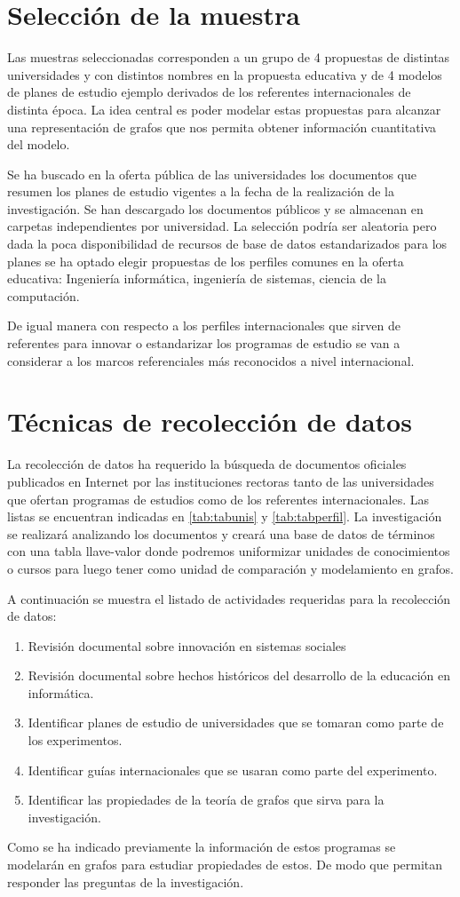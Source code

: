 \section{Selección de la muestra}
Las muestras seleccionadas corresponden a un grupo de 4 propuestas de distintas universidades y con distintos nombres en la propuesta educativa y de 4 modelos de planes de estudio ejemplo derivados de los referentes internacionales de distinta época. La idea central es poder modelar estas propuestas para alcanzar una representación de grafos que nos permita obtener información cuantitativa del modelo.

Se ha buscado en la oferta pública de las universidades los documentos que resumen los planes de estudio vigentes a la fecha de la realización de la investigación. Se han descargado los documentos públicos y se almacenan en carpetas independientes por universidad. La selección podría ser aleatoria pero dada la poca disponibilidad de recursos de base de datos estandarizados para los planes se ha optado elegir propuestas de los perfiles comunes en la oferta educativa: Ingeniería informática, ingeniería de sistemas, ciencia de la computación.

De igual manera con respecto a los perfiles internacionales que sirven de referentes para innovar o estandarizar los programas de estudio se van a considerar a los marcos referenciales más reconocidos a nivel internacional.

\section{Técnicas de recolección de datos}

La recolección de datos ha requerido la búsqueda de documentos oficiales publicados en Internet por las instituciones rectoras tanto de las universidades que ofertan programas de estudios como de los referentes internacionales. Las listas se encuentran indicadas en \ref{tab:tabunis} y \ref{tab:tabperfil}. La investigación se realizará analizando los documentos y creará una base de datos de términos con una tabla llave-valor donde podremos uniformizar unidades de conocimientos o cursos para luego tener como unidad de comparación y modelamiento en grafos.

A continuación se muestra el listado de actividades requeridas para la recolección de datos:

\begin{enumerate}
	\item Revisión documental sobre innovación en sistemas sociales
	\item Revisión documental sobre hechos históricos del desarrollo de la educación en informática.
	\item Identificar planes de estudio de universidades que se tomaran como parte de los experimentos.
	\item Identificar guías internacionales que se usaran como parte del experimento.
	\item Identificar las propiedades de la teoría de grafos que sirva para la investigación.

\end{enumerate}

Como se ha indicado previamente la información de estos programas se modelarán en grafos para estudiar propiedades de estos. De modo que permitan responder las preguntas de la investigación. 




